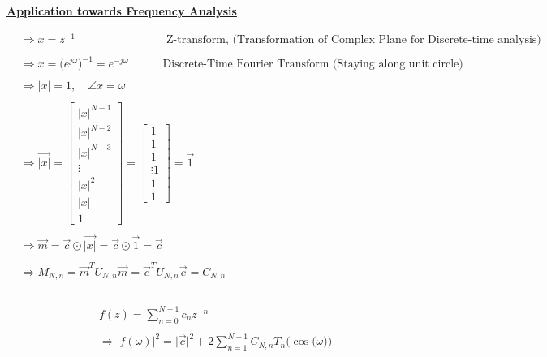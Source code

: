 \documentclass{article}
\begin{document}
\textbf{\underline{Application towards Frequency Analysis}}

\begin{align*}
    & \Rightarrow x = z^{-1} \quad \quad \quad \quad \quad \quad \quad \quad \text{Z-transform, (Transformation of Complex Plane for Discrete-time analysis)} \\ \\
    & \Rightarrow x = \big(e^{j\omega}\big)^{-1} = e^{-j\omega} \quad \quad \quad \text{Discrete-Time Fourier Transform (Staying along unit circle)} \\ \\
    & \Rightarrow |x| = 1, \quad \angle{x} = \omega \\ \\
    & \Rightarrow \vec{|x|} = \begin{bmatrix}
                                    |x|^{N - 1} \\
                                    |x|^{N - 2} \\
                                    |x|^{N - 3} \\
                                    \vdots \\
                                    |x|^{2} \\
                                    |x| \\
                                    1
                                \end{bmatrix}
                            = \begin{bmatrix}
                                    1 \\
                                    1 \\
                                    1 \\
                                    \vdots
                                    1 \\
                                    1 \\
                                    1
                                \end{bmatrix} = \vec{1} \\ \\
    & \Rightarrow \vec{m} = \vec{c} \odot \vec{|x|} = \vec{c} \odot \vec{1} = \vec{c} \\ \\
    & \Rightarrow M_{N, n} = \vec{m}^{T}U_{N, n}\vec{m} = \vec{c}^{T}U_{N, n}\vec{c} = C_{N, n} 
\end{align*}

\begin{align*}
    & \\ \\
    & f(z) = \sum_{n = 0}^{N - 1}c_{n}z^{-n} \\ \\
    &\Rightarrow |f(\omega)|^{2} = \big|\vec{c}\big|^{2} + 2\sum_{n=1}^{N - 1}C_{N, n}T_{n}\Big(\cos\big(\omega\big)\Big) 
\end{align*}
\end{document}
